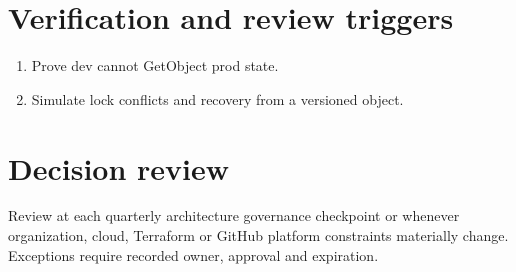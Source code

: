 \documentclass[11pt]{article}
\begin{document}
\section*{Verification and review triggers}
\begin{enumerate}[leftmargin=*]
\item Prove dev cannot GetObject prod state.
\item Simulate lock conflicts and recovery from a versioned object.
\end{enumerate}
\section*{Decision review}
Review at each quarterly architecture governance checkpoint or whenever organization, cloud, Terraform or GitHub platform constraints materially change. Exceptions require recorded owner, approval and expiration.
\end{document}
